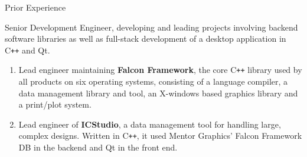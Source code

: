 \documentclass{resume}
\newcommand{\CC}{C{\tt ++}}
\begin{document}
\begin{category}{Prior Experience}
\begin{enumerate}






\end{enumerate}



  Senior Development Engineer, developing and leading projects involving backend software libraries as well as full-stack development of a desktop application in \CC{}
  and Qt.

  \begin{enumerate}
  \item Lead engineer maintaining \textbf{Falcon Framework}, the core \CC{} library used by all products on six operating systems, consisting of a language
    compiler, a data management library and tool, an X-windows based graphics library and a
    print/plot system.
  \item Lead engineer of \textbf{ICStudio}, a data management tool for
    handling large, complex designs.  Written in \CC{}, it used Mentor
    Graphics' Falcon Framework DB in the backend and Qt in the front end.
  \end{enumerate}


\end{category}
\end{document}
